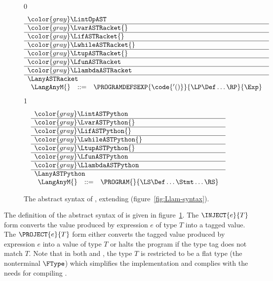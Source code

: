 \documentclass[7x10]{TimesAPriori_MIT}%
\newcommand{\gray}[1]{{\color{gray} #1}}
\def\racketEd{0}
\def\pythonEd{1}
\providecommand{\BookEdition}{1}
\let\edition\BookEdition
\newcommand{\racket}[1]{{\if\edition\racketEd{#1}\fi}}
\newcommand{\pythonColor}[0]{}
\numberwithin{theorem}{chapter}
\numberwithin{definition}{chapter}
\numberwithin{equation}{chapter}
\begin{document}
\begin{figure}[tp]
\centering
\begin{tcolorbox}[colback=white]
    \small
{\if\edition\racketEd
\[
\begin{array}{l}
  \gray{\LintOpAST} \\ \hline
  \gray{\LvarASTRacket{}} \\ \hline
  \gray{\LifASTRacket{}} \\ \hline
  \gray{\LwhileASTRacket{}} \\ \hline
  \gray{\LtupASTRacket{}} \\ \hline
  \gray{\LfunASTRacket} \\ \hline
  \gray{\LlambdaASTRacket} \\ \hline
  \LanyASTRacket \\
\begin{array}{lcl}
  \LangAnyM{} &::=& \PROGRAMDEFSEXP{\code{'()}}{\LP\Def\ldots\RP}{\Exp}
\end{array}
\end{array}
\]
\fi}
{\if\edition\pythonEd\pythonColor
\[
\begin{array}{l}
  \gray{\LintASTPython} \\ \hline
  \gray{\LvarASTPython{}} \\ \hline
  \gray{\LifASTPython{}} \\ \hline
  \gray{\LwhileASTPython{}} \\ \hline
  \gray{\LtupASTPython{}} \\ \hline
  \gray{\LfunASTPython} \\ \hline
  \gray{\LlambdaASTPython} \\ \hline
  \LanyASTPython \\
  \begin{array}{lcl}
  \LangAnyM{} &::=& \PROGRAM{}{\LS \Def \ldots \Stmt \ldots \RS}
  \end{array}
\end{array}
\]
\fi}
\end{tcolorbox}

\caption{The abstract syntax of \LangAny{}, extending \LangLam{} (figure~\ref{fig:Llam-syntax}).}
\label{fig:Lany-syntax}
\end{figure}

The definition of the abstract syntax of \LangAny{} is given in
figure~\ref{fig:Lany-syntax}.
The $\INJECT{e}{T}$ form converts the value produced by expression $e$
of type $T$ into a tagged value.  The $\PROJECT{e}{T}$ form either
converts the tagged value produced by expression $e$ into a value of
type $T$ or halts the program if the type tag does not match $T$.
%
Note that in both  and , the type $T$ is
restricted to be a flat type (the nonterminal $\FType$) which
simplifies the implementation and complies with the needs for
compiling \LangDyn{}.
\end{document}
